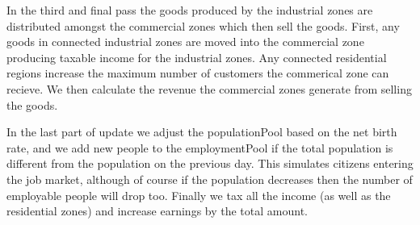 In the third and final pass the goods produced by the industrial zones are distributed amongst the commercial zones which then sell the goods. First, any goods in connected industrial zones are moved into the commercial zone producing taxable income for the industrial zones. Any connected residential regions increase the maximum number of customers the commerical zone can recieve. We then calculate the revenue the commercial zones generate from selling the goods.


\begin{DoxyCode}{0}
\DoxyCodeLine{    \textcolor{comment}{/* Adjust population pool for births and deaths */}}
\DoxyCodeLine{}
\DoxyCodeLine{    \textcolor{comment}{/* Adjust the employment pool for the changing population */}}
\DoxyCodeLine{}
\DoxyCodeLine{    \textcolor{comment}{/* Update the city population */}}
\DoxyCodeLine{}
\DoxyCodeLine{    \textcolor{comment}{/* Calculate city income from tax */}}
\DoxyCodeLine{}
\DoxyCodeLine{    \textcolor{keywordflow}{return};}
\DoxyCodeLine{\}}

\end{DoxyCode}


In the last part of {\ttfamily update} we adjust the {\ttfamily population\+Pool} based on the net birth rate, and we add new people to the {\ttfamily employment\+Pool} if the total population is different from the population on the previous day. This simulates citizens entering the job market, although of course if the population decreases then the number of employable people will drop too. Finally we tax all the income (as well as the residential zones) and increase {\ttfamily earnings} by the total amount.

